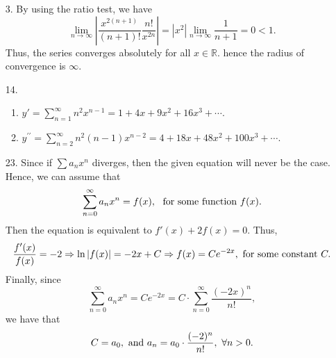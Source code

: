 \documentclass[12pt,a4paper]{article}
\newcommand{\re}{\mathbb{R}}
\begin{document}
\begin{enumerate}[topsep=0pt,]
    \item[3.] By using the ratio test, we have 
    \[
        \lim_{{n}\to {\infty}} \left|\frac{x^{2(n + 1)}}{(n + 1)!} \frac{n!}{x^{2n}}\right| = \left|x^2\right|\lim_{{n}\to {\infty}} \frac{1}{n + 1} = 0 < 1. 
    \]
    Thus, the series converges absolutely for all $x \in \re$. hence the radius of convergence is $\infty$.
    \item[14.] \begin{enumerate}[label=\alph*.,noitemsep,topsep=0pt]
        \item $\displaystyle y' = \sum_{n=1}^{\infty}n ^2 x^{n - 1} = 1 + 4x + 9x ^2 + 16 x ^3 +\cdots $.
        \item $\displaystyle y^{\prime\prime} = \sum_{n=2}^{\infty}n ^2 (n - 1) x^{n - 2} = 4 + 18x + 48x ^2  + 100 x ^3 +\cdots $.                 
    \end{enumerate}
    \item[23.] Since if $\sum a_nx^n$ diverges, then the given equation will never be the case. Hence, we can assume that 
    \[
        \sum_{n=0}^{\infty} a_n x^n = f(x),\ \textup{ for some function } f(x).
    \]
    Then the equation is equivalent to $f'(x) + 2 f(x) = 0.$ Thus, 
    \[
        \dfrac{f'(x)}{f(x)} = - 2 \Rightarrow \ln |f(x)| = - 2x + C \Rightarrow f(x) = Ce^{ - 2x},\textup{\ for some constant }C.
    \]
    Finally, since 
    \[
        \sum_{n=0}^{\infty}a_n x^n =  C e^{ - 2x} = C \cdot \sum_{n=0}^{\infty}\frac{ ( - 2x)^n}{n!},
    \]
    we have that 
    \[
        C = a_0 , \textup{ and }a_n = a_0 \cdot \frac{(-2)^n}{n!},\ \forall n > 0.
    \]
\end{enumerate}
\end{document}
